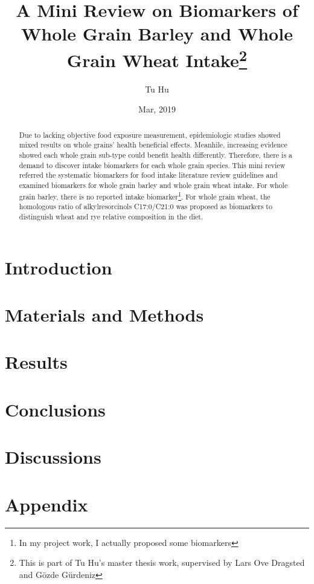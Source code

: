 \documentclass[]{article}
\title{A Mini Review on Biomarkers of Whole Grain Barley and Whole Grain Wheat Intake\footnote{This is part of Tu Hu's master thesis work, supervised by Lars Ove Dragsted and Gözde Gürdeniz}}
\author{Tu Hu}
\date{Mar, 2019}
\begin{document}
\maketitle

\begin{abstract}
Due to lacking objective food exposure measurement, epidemiologic studies showed mixed results on whole grains' health beneficial effects.
Meanhile, increasing evidence showed each whole grain sub-type could benefit health differently. 
Therefore, there is a demand to discover intake biomarkers for each whole grain species.
This mini review referred the systematic biomarkers for food intake literature review guidelines and examined biomarkers for whole grain barley and whole grain wheat intake.
For whole grain barley, there is no reported intake biomarker\footnote{In my project work, I actually proposed some biomarkers}.
For whole grain wheat, the homologous ratio of alkylresorcinols C17:0/C21:0 was proposed as biomarkers to distinguish wheat and rye relative composition in the diet.

\end{abstract}

\section{Introduction}


\section{Materials and Methods}


\section{Results}


\section{Conclusions}

\section{Discussions}


\section{Appendix}


\clearpage
\printbibliography[
heading=bibintoc,
title={References}
]
\end{document}
